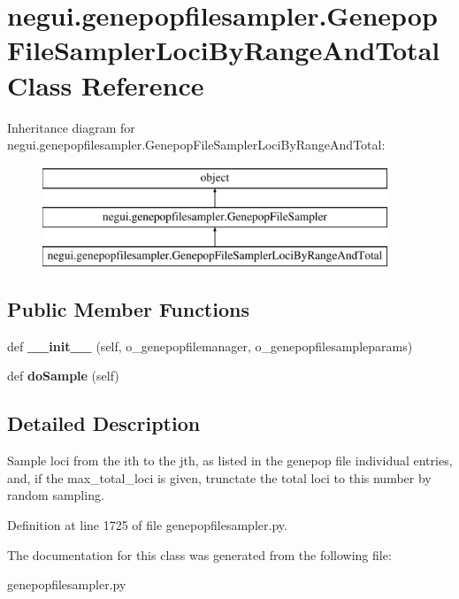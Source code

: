\hypertarget{classnegui_1_1genepopfilesampler_1_1GenepopFileSamplerLociByRangeAndTotal}{}\section{negui.\+genepopfilesampler.\+Genepop\+File\+Sampler\+Loci\+By\+Range\+And\+Total Class Reference}
\label{classnegui_1_1genepopfilesampler_1_1GenepopFileSamplerLociByRangeAndTotal}
Inheritance diagram for negui.\+genepopfilesampler.\+Genepop\+File\+Sampler\+Loci\+By\+Range\+And\+Total\+:\begin{figure}[H]
\begin{center}
\leavevmode
\includegraphics[height=3.000000cm]{classnegui_1_1genepopfilesampler_1_1GenepopFileSamplerLociByRangeAndTotal}
\end{center}
\end{figure}
\subsection*{Public Member Functions}
\begin{DoxyCompactItemize}
\item 
def {\bfseries \+\_\+\+\_\+init\+\_\+\+\_\+} (self, o\+\_\+genepopfilemanager, o\+\_\+genepopfilesampleparams)\hypertarget{classnegui_1_1genepopfilesampler_1_1GenepopFileSamplerLociByRangeAndTotal_ae2cef3a5eb0c188c3a2e147e8e93c79f}{}\label{classnegui_1_1genepopfilesampler_1_1GenepopFileSamplerLociByRangeAndTotal_ae2cef3a5eb0c188c3a2e147e8e93c79f}

\item 
def {\bfseries do\+Sample} (self)\hypertarget{classnegui_1_1genepopfilesampler_1_1GenepopFileSamplerLociByRangeAndTotal_a9295dd78f7b537acbefd16868cbcb58e}{}\label{classnegui_1_1genepopfilesampler_1_1GenepopFileSamplerLociByRangeAndTotal_a9295dd78f7b537acbefd16868cbcb58e}

\end{DoxyCompactItemize}


\subsection{Detailed Description}
\begin{DoxyVerb}Sample loci from the ith to the jth, as listed in the 
genepop file individual entries, and, if the max_total_loci 
is given, trunctate the total loci to this number by random sampling.
\end{DoxyVerb}
 

Definition at line 1725 of file genepopfilesampler.\+py.



The documentation for this class was generated from the following file\+:\begin{DoxyCompactItemize}
\item 
genepopfilesampler.\+py\end{DoxyCompactItemize}

